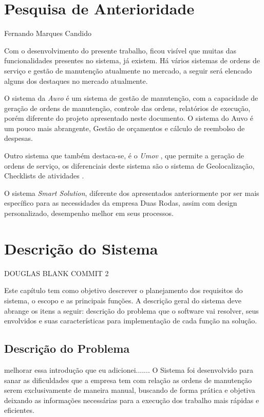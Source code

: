 \chapter{Pesquisa de Anterioridade}

Fernando Marques Candido

Com o desenvolvimento do presente trabalho, ficou visível que muitas das funcionalidades presentes no sistema, já existem. Há vários sistemas de ordens de serviço e gestão de manutenção atualmente no mercado, a seguir será elencado alguns dos destaques no mercado atualmente.

O sistema da \textit{Auvo} é um sistema de gestão de manutenção, com a capacidade de geração de ordens de manutenção, controle das ordens, relatórios de execução, porém diferente do
projeto apresentado neste documento. O sistema do Auvo é um pouco mais abrangente,
Gestão de orçamentos e cálculo de reembolso de despesas.\cite{Auvo2019}

Outro sistema que também destaca-se, é o \textit{Umov} 
, que permite a geração de ordens de serviço,
os diferenciais deste sistema são o sistema de Geolocalização, Checklists de atividades \cite{umov2019}.

O sistema \textit{Smart Solution}, diferente dos apresentados anteriormente por ser mais específico para as
necessidades da empresa Duas Rodas, assim com design personalizado, desempenho melhor em seus processos.


\chapter{Descrição do Sistema }

DOUGLAS BLANK COMMIT 2

Este capítulo tem como objetivo descrever o planejamento dos requisitos  do sistema, o escopo e as principais funções. A descrição geral do sistema deve abrange os itens a seguir: descrição do problema que o software vai resolver, seus envolvidos e suas características para implementação de cada função na solução.



\section{Descrição do Problema}
 {\color{red} melhorar essa introdução que eu adicionei.......
 O  Sistema foi desenvolvido para sanar as dificuldades que a empresa tem com relação as ordens de manutenção serem exclusivamente de maneira manual, buscando de forma prática e objetiva deixando as informações necessárias para a execução dos trabalho mais rápidas e eficientes.}

